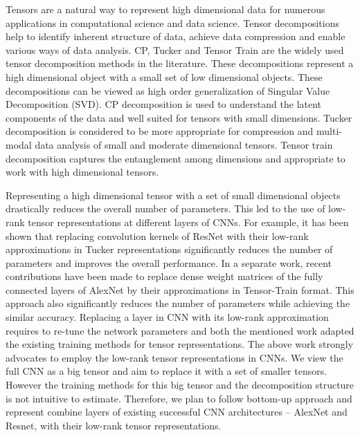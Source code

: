 Tensors are a natural way to represent high dimensional data for numerous applications in computational science and data science. Tensor decompositions help to identify inherent structure of data, achieve data compression and enable various ways of data analysis. CP, Tucker and Tensor Train are the widely used tensor decomposition methods in the literature. These decompositions represent a high dimensional object with a small set of low dimensional objects. These decompositions can be viewed as high order generalization of Singular Value Decomposition (SVD). CP decomposition is used to understand the latent components of the data and well suited for tensors with small dimensions. Tucker decomposition is considered to be more appropriate for compression and multi-modal data analysis of small and moderate dimensional tensors. Tensor train decomposition captures the entanglement among dimensions and appropriate to work with high dimensional tensors.


Representing a high dimensional tensor with a set of small dimensional objects drastically reduces the overall number of parameters. This led to the use of low-rank tensor representations at different layers of CNNs. For example, it has been shown that replacing convolution kernels of ResNet with their low-rank approximations in Tucker representations significantly reduces the number of parameters and improves the overall performance. In a separate work, recent contributions have been made to replace dense weight matrices of the fully connected layers of AlexNet by their approximations in Tensor-Train format. This approach also significantly reduces the number of parameters while achieving the similar accuracy. Replacing a layer in CNN with its low-rank approximation requires to re-tune the network parameters and both the mentioned work adapted the existing training methods for tensor representations. The above work strongly advocates to employ the low-rank tensor representations in CNNs. We view the full CNN as a big tensor and aim to replace it with a set of smaller tensors. However the training methods for this big tensor and the decomposition structure is not intuitive to estimate. Therefore, we plan to follow bottom-up approach and represent combine layers of existing successful CNN architectures -- AlexNet and Resnet, with their low-rank tensor representations.





